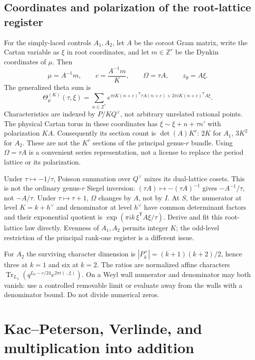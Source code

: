 \documentclass[11pt]{article}
\theoremstyle{definition}
\theoremstyle{remark}
\newcommand{\Z}{\mathbb{Z}}
\begin{document}
\subsection{Coordinates and polarization of the root-lattice register}\label{sec:root-coordinates}
For the simply-laced controls $A_1,A_2$, let $A$ be the coroot Gram matrix,
write the Cartan variable as $\xi$ in root coordinates, and let
$m\in\Z^r$ be the Dynkin coordinates of $\mu$. Then
\[
 \mu=A^{-1}m,\qquad c=\frac{A^{-1}m}{K},\qquad
 \Omega=\tau A,\qquad z_{\theta}=A\xi .
\]
The generalized theta sum is
\[
 \Theta_\mu^{(K)}(\tau,\xi)=
 \sum_{n\in\Z^r}
 e^{\pi iK(n+c)^{\mathsf T}\tau A(n+c)+2\pi iK(n+c)^{\mathsf T}A\xi}.
\]
Characteristics are indexed by $P/KQ^\vee$, not arbitrary unrelated
rational points. The physical Cartan torus in these coordinates has
$\xi\sim\xi+n+\tau n'$ with polarization $KA$. Consequently its
section count is $\det(A)K^r$: $2K$ for $A_1$, $3K^2$ for $A_2$.
These are not the $K^r$ sections of the principal genus-$r$ bundle.
Using $\Omega=\tau A$ is a convenient series representation, not a
license to replace the period lattice or its polarization.

Under $\tau\mapsto-1/\tau$, Poisson summation over $Q^\vee$ mixes its
dual-lattice cosets. This is not the ordinary genus-$r$ Siegel inversion:
$(\tau A)\mapsto-(\tau A)^{-1}$ gives $-A^{-1}/\tau$, not $-A/\tau$.
Under $\tau\mapsto\tau+1$, $\Omega$ changes by $A$, not by $I$.
At $S$, the numerator at level $K=k+h^\vee$ and denominator at level
$h^\vee$ have common determinant factors and their exponential quotient is
$\exp(\pi i k\,\xi^{\mathsf T}A\xi/\tau)$. Derive and fit this
root-lattice law directly. Evenness of $A_1,A_2$ permits integer $K$;
the odd-level restriction of the principal rank-one register is a
different issue.

For $A_2$ the surviving character dimension is
$|P_k^+|=(k+1)(k+2)/2$, hence three at $k=1$ and six at $k=2$.
The ratios are normalized affine characters
$\operatorname{Tr}_{L_\lambda}(q^{L_0-c/24}e^{2\pi i(\cdot,\xi)})$.
On a Weyl wall numerator and denominator may both vanish: use a
controlled removable limit or evaluate away from the walls with a
denominator bound. Do not divide numerical zeros.

\section{Kac--Peterson, Verlinde, and multiplication into addition}\label{sec:verlinde}
\end{document}
